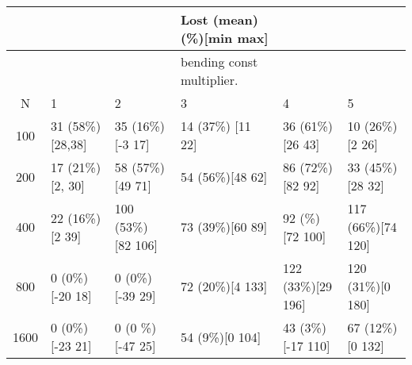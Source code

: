 \documentclass[12pt]{report}
\begin{document}
\begin{table}[H]
	\tiny{
 \begin{tabular}{c| l l l l l}
 	   &           & & Lost (mean) (\%)[min max]& &  \\
 	 \hline
 	   &           & & bending const multiplier. & &  \\
 	   \hline 
     N 	   &            1 & 2 & 3 & 4& 5 \\   	 
 	 \hline 
 	 100 & 31 (58\%) [28,38] & 35 (16\%)[-3 17]    & 14 (37\%) [11 22] & 36 (61\%)[26 43]   & 10 (26\%)[2 26]\\
 	 200 & 17 (21\%) [2, 30] & 58 (57\%)[49 71]    & 54 (56\%)[48 62]  & 86 (72\%) [82 92]  & 33 (45\%)[28 32]\\
 	 400 & 22 (16\%) [2 39]  & 100 (53\%) [82 106] & 73 (39\%)[60 89]  & 92 (\%)[72 100]    & 117 (66\%)[74 120] \\
 	 800 &  0 (0\%) [-20 18] & 0 (0\%) [-39 29]    & 72 (20\%)[4 133]  & 122 (33\%)[29 196] & 120 (31\%)[0 180]\\
 	 1600&  0 (0\%)[-23 21]  & 0 (0 \%) [-47 25]   & 54 (9\%)[0 104]   & 43 (3\%)[-17 110]  & 67 (12\%)[0 132]\\
 \end{tabular}
}
\end{table}
\end{document}
